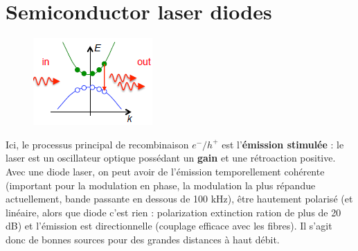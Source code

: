 \section{Semiconductor laser diodes}
	\begin{figure}
	\includegraphics[scale=0.85]{ch4/image11}
	\end{figure}
Ici, le processus principal de recombinaison $e^-/h^+$ est l'\textbf{émission stimulée} : le laser
est un oscillateur optique possédant un \textbf{gain} et une rétroaction positive. Avec une diode 
laser, on peut avoir de l'émission temporellement cohérente (important pour la modulation en phase,
la modulation la plus répandue actuellement, bande passante en dessous de 100 kHz),
être hautement polarisé (et linéaire, alors que diode c'est rien : polarization extinction ration 
de plus de 20 dB) et l'émission est directionnelle (couplage efficace avec les fibres). Il s'agit
donc de bonnes sources pour des grandes distances à haut débit.

